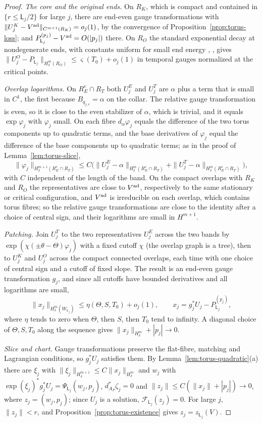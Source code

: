 \documentclass[11pt]{amsart}
\theoremstyle{definition}
\theoremstyle{remark}
\theoremstyle{plain}
\numberwithin{equation}{section}
\begin{document}
\begin{proof}
\emph{The core and the original ends.} On $R_K$, which is compact and contained in
$\{r\le \mathsf L_j/2\}$ for large $j$, there are end-even gauge transformations with
$\|U^K_j-V^{\rm ad}\|_{C^{m+1}(R_K)}=o_j(1)$, by the convergence of
Proposition~\ref{prop:torus-loss}; and $P^{(p_j)}_{\mathsf L_j}-V^{\rm ad}=O(|p_j|)$ there. On $R_O$
the standard exponential decay at nondegenerate ends, with constants uniform for
small end energy \cite[Section~4.1]{Donaldson-book}, \cite{RS-strips}, gives
$\|U^O_j-P_{\mathsf L_j}\|_{H^m_\delta(R_O)}\le\varsigma(T_0)+o_j(1)$ in temporal gauges normalized at the
critical points.

\emph{Overlap logarithms.} On $R^e_E\cap R_T$ both $U^E_j$ and $U^T_j$ are $\alpha$ plus a
term that is small in $C^1$, the first because $B_{q_{j,e}}=\alpha$ on the collar. The
relative gauge transformation is even, so it is close to the even stabilizer of
$\alpha$, which is trivial, and it equals $\exp\varphi_j$ with $\varphi_j$ small. On each fibre
$d_\alpha\varphi_j$ equals the difference of the two torus components up to quadratic
terms, and the base derivatives of $\varphi_j$ equal the difference of the base
components up to quadratic terms; as in the proof of Lemma~\ref{lem:torus-slice},
\[
\|\varphi_j\|_{H^{m+1}_\delta(R^e_E\cap R_T)}\le C\bigl(\|U^E_j-\alpha\|_{H^m_\delta(R^e_E\cap R_T)}
+\|U^T_j-\alpha\|_{H^m_\delta(R^e_E\cap R_T)}\bigr),
\]
with $C$ independent of the length of the band. On the compact overlaps with
$R_K$ and $R_O$ the representatives are close to $V^{\rm ad}$, respectively to the
same stationary or critical configuration, and $V^{\rm ad}$ is irreducible on each
overlap, which contains torus fibres; so the relative gauge transformations are
close to the identity after a choice of central sign, and their logarithms are
small in $H^{m+1}$.

\emph{Patching.} Join $U^T_j$ to the two representatives $U^E_j$ across the two bands by
$\exp(\chi(\pm\theta-\Theta)\varphi_j)$ with a fixed cutoff $\chi$ (the overlap graph is a tree),
then to $U^K_j$ and $U^O_j$ across the compact connected overlaps, each time with one choice of
central sign and a cutoff of fixed slope. The result is an end-even gauge transformation $g_j$,
and since all cutoffs have bounded derivatives and all logarithms are small,
\[
\|x_j\|_{H^m_\delta(W_{\mathsf L_j})}\le\eta(\Theta,S,T_0)+o_j(1),\qquad x_j=g_j^*U_j-P^{(p_j)}_{\mathsf L_j},
\]
where $\eta$ tends to zero when $\Theta$, then $S$, then $T_0$ tend to infinity. A
diagonal choice of $\Theta,S,T_0$ along the sequence gives $\|x_j\|_{H^m_\delta}+|p_j|\to0$.

\emph{Slice and chart.} Gauge transformations preserve the flat-fibre, matching
and Lagrangian conditions, so $g_j^*U_j$ satisfies them. By
Lemma~\ref{lem:torus-quadratic}(a) there are $\xi_j$ with
$\|\xi_j\|_{H^{m+1}_\delta}\le C\|x_j\|_{H^m_\delta}$ and $w_j$ with
$\exp(\xi_j)^*g_j^*U_j=\Psi_{\mathsf L_j}(w_j,p_j)$, $d^*_{A_P}\zeta_j=0$ and
$\|z_j\|\le C(\|x_j\|+|p_j|)\to0$, where $z_j=(w_j,p_j)$; since $U_j$ is a solution,
$\mathcal F_{\mathsf L_j}(z_j)=0$. For large $j$, $\|z_j\|<r$, and Proposition~\ref{prop:torus-existence}
gives $z_j=z_{\mathsf L_j}(V)$.
\end{proof}
\end{document}
